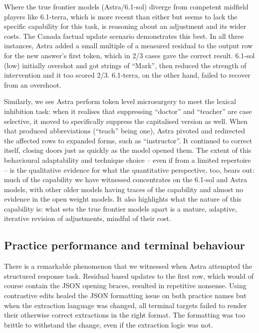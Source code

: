Where the true frontier models (Astra/6.1-sol) diverge from competent midfield players like 6.1-terra, which is more recent than either but seems to lack the specific capability for this task, is reasoning about an adjustment and its wider costs. The Canada factual update scenario demonstrates this best. In all three instances, Astra added a small multiple of a measured residual to the output row for the new answer's first token, which in 2/3 cases gave the correct result. 6.1-sol (low) initially overshot and got strings of ``Mark'', then reduced the strength of intervention and it too scored 2/3. 6.1-terra, on the other hand, failed to recover from an overshoot. 

Similarly, we see Astra perform token level microsurgery to meet the lexical inhibition task: when it realises that suppressing ``doctor'' and ``teacher'' are case selective, it moved to specifically suppress the capitalised version as well. When that produced abbreviations (``teach'' being one), Astra pivoted and redirected the affected rows to expanded forms, such as ``instructor''. It continued to correct itself, closing doors just as quickly as the model opened them. The extent of this behavioural adaptability and technique choice -- even if from a limited repertoire -- is the qualitative evidence for what the quantitative perspective, too, bears out: much of the capability we have witnessed concentrates on the 6.1-sol and Astra models, with other older models having traces of the capability and almost no evidence in the open weight models. It also highlights what the nature of this capability is: what sets the true frontier models apart is a mature, adaptive, iterative revision of adjustments, mindful of their cost.

\subsection{Practice performance and terminal
behaviour}\label{practice-performance-and-terminal-behaviour}

There is a remarkable phenomenon that we witnessed when Astra attempted the structured response task. Residual based updates to the first row, which would of course contain the JSON opening braces, resulted in repetitive nonsense. Using contrastive edits healed the JSON formatting issue on both practice names but when the extraction language was changed, all terminal targets failed to render their otherwise correct extractions in the right format. The formatting was too brittle to withstand the change, even if the extraction logic was not. 



